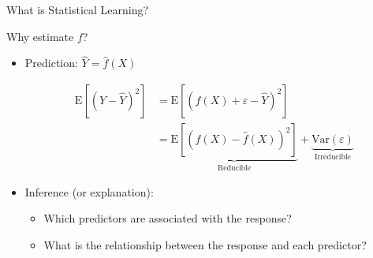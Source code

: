 \documentclass[14pt]{beamer}
\begin{document}
\begin{frame}{What is Statistical Learning?}\large



\end{frame}


\begin{frame}{Why estimate $f$?}
\vspace{-0.5cm}

\begin{itemize}
	\item Prediction: $ \hat Y = \hat f(X)$

\begin{align*}
	\text{E}[(Y - \hat Y)^2] &= \text{E}[(f(X) + \varepsilon - \hat Y)^2] \\
					  &= \underbrace{\text{E}[(f(X) - \hat f(X))^2]}_{\text{Reducible}} + \underbrace{\text{Var}(\varepsilon)}_{\text{Irreducible}}
\end{align*} 
	
	\item Inference (or explanation):
	\begin{itemize}
	\item Which predictors are associated with the response?
	\item What is the relationship between the response and each predictor?
	\end{itemize}
\end{itemize}

\end{frame}
\end{document}
